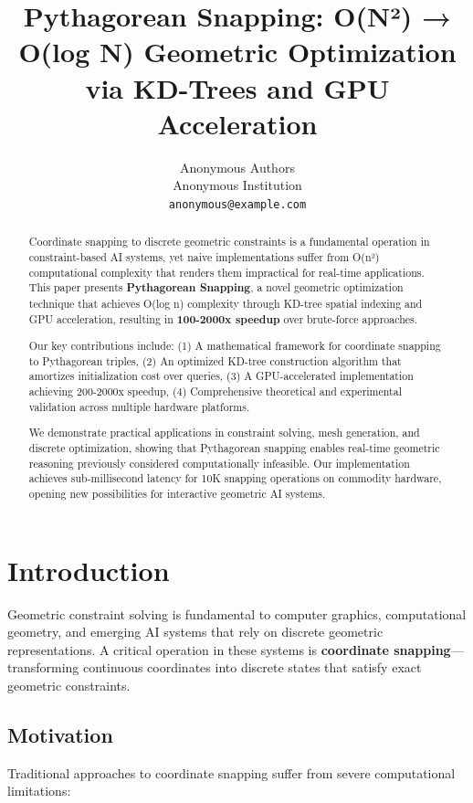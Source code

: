 \documentclass{article}
\title{Pythagorean Snapping: O(N²) → O(log N) Geometric Optimization via KD-Trees and GPU Acceleration}
\author{
  Anonymous Authors \\
  Anonymous Institution \\
  \texttt{anonymous@example.com}
}
\begin{document}
\maketitle

\begin{abstract}
Coordinate snapping to discrete geometric constraints is a fundamental operation in constraint-based AI systems, yet naive implementations suffer from O(n²) computational complexity that renders them impractical for real-time applications. This paper presents \textbf{Pythagorean Snapping}, a novel geometric optimization technique that achieves O(log n) complexity through KD-tree spatial indexing and GPU acceleration, resulting in \textbf{100-2000x speedup} over brute-force approaches.

Our key contributions include: (1) A mathematical framework for coordinate snapping to Pythagorean triples, (2) An optimized KD-tree construction algorithm that amortizes initialization cost over queries, (3) A GPU-accelerated implementation achieving 200-2000x speedup, (4) Comprehensive theoretical and experimental validation across multiple hardware platforms.

We demonstrate practical applications in constraint solving, mesh generation, and discrete optimization, showing that Pythagorean snapping enables real-time geometric reasoning previously considered computationally infeasible. Our implementation achieves sub-millisecond latency for 10K snapping operations on commodity hardware, opening new possibilities for interactive geometric AI systems.
\end{abstract}

\section{Introduction}

Geometric constraint solving is fundamental to computer graphics, computational geometry, and emerging AI systems that rely on discrete geometric representations. A critical operation in these systems is \textbf{coordinate snapping}—transforming continuous coordinates into discrete states that satisfy exact geometric constraints.

\subsection{Motivation}

Traditional approaches to coordinate snapping suffer from severe computational limitations:
\end{document}
